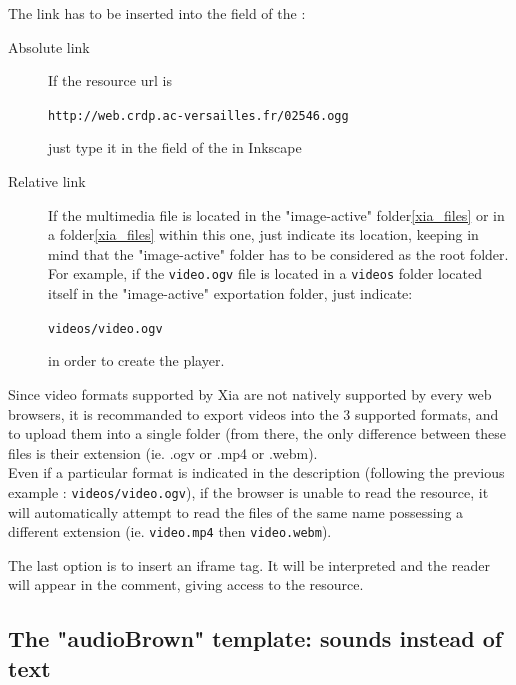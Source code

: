 The link has to be inserted into the  field of the :
\begin{description}
 \item[Absolute link] If the resource url is
 
 \verb|http://web.crdp.ac-versailles.fr/02546.ogg|
 
 just type it in the  field of the  in 
 Inkscape
 
 \item [Relative link] If the multimedia file is located in the "image-active" 
 folder\ref{xia_files} or in a folder\ref{xia_files} within this one, just indicate its location, keeping in 
 mind that the "image-active" folder has to be considered as the root folder. 
 For example, if the \verb|video.ogv| file is located in a \verb|videos| 
 folder located itself in the "image-active" exportation folder, just indicate:
 
  \verb|videos/video.ogv|
 
  in order to create the player.
\end{description}

Since video formats supported by Xia are not natively supported by every web 
browsers, it is recommanded to export videos into the 3 supported formats, 
and to upload them into a single folder (from there, the only difference 
between these files is their extension (ie. .ogv or .mp4 or .webm).\\




Even if a particular format is indicated in the description (following 
the previous example : \verb|videos/video.ogv|), if the browser is 
unable to read the resource, it will automatically attempt to read the files 
of the same name possessing a different extension (ie. \verb|video.mp4| 
then \verb|video.webm|).

The last option is to insert an iframe tag.
It will be interpreted and the reader will appear in the comment, 
giving access to the resource.

\subsection{The "audioBrown" template: sounds instead of text}

